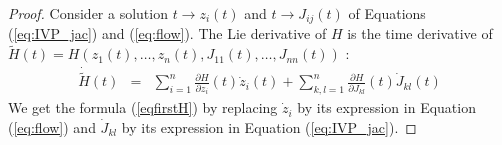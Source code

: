 \documentclass{sig-alternate-05-2015} %
\begin{document}
\begin{proof}
Consider a solution $t \rightarrow z_i(t)$ and $t \rightarrow J_{ij}(t)$ of
Equations (\ref{eq:IVP_jac}) and (\ref{eq:flow}). The Lie derivative of $H$
is
the time derivative of $\tilde{H}(t)=H(z_1(t),\ldots,z_n(t),J_{11}(t),\ldots,J_{nn}(t))$ : 
$$\begin{array}{rcl}
\dot{\tilde{H}}(t) & = & \sum\limits_{i=1}^{n} \frac{\partial H}{\partial z_i}(t)
\dot{z}_i(t)+\sum\limits_{k,l=1}^n \frac{\partial H}{\partial J_{kl}}(t) \dot{J}_{kl}(t)
\end{array}$$
We get the formula (\ref{eqfirstH}) by 
replacing $\dot{z}_i$ by its expression in Equation (\ref{eq:flow}) and
$\dot{J}_{kl}$ by its expression in Equation (\ref{eq:IVP_jac}). 
\end{proof}
\end{document}
